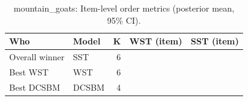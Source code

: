 \begin{table}[!h]
\centering
\caption{mountain_goats: Item-level order metrics (posterior mean, 95\% CI).\\\label{tab:app-mountain_goats-best-item-families}}
\centering
\begin{tabular}[t]{llrrr}
\toprule
Who & Model & K & WST (item) & SST (item)\\
\midrule
Overall winner & SST & 6 &  & \\
Best WST & WST & 6 &  & \\
Best DCSBM & DCSBM & 4 &  & \\
\bottomrule
\end{tabular}
\end{table}
